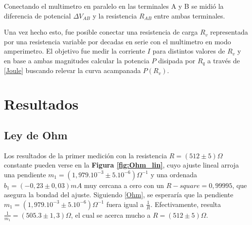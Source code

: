 \documentclass[11pt,a4paper]{article}
\begin{document}
Conectando el multimetro en paralelo en las terminales A y B se midió la diferencia de potencial $\Delta V_{AB}$ y la resistencia $R_{AB}$  entre ambas terminales.

Una vez hecho esto, fue posible conectar una resistencia de carga $R_v$ representada por una resistencia variable por decadas en serie con el multimetro en modo amperimetro. El objetivo fue medir la corriente $I$ para distintos valores de $R_v$ y en base a ambas magnitudes calcular la potencia $P$ disipada por $R_q$ a través de \eqref{Joule} buscando relevar la curva acampanada $P(R_v)$.




\section{Resultados}
\label{sec:discusion}

\subsection{Ley de Ohm}

Los resultados de la primer medición con la resistencia $R = (512 \pm 5)\Omega$ constante pueden verse en la \textbf{Figura \ref{fig:Ohm_lin}}, cuyo ajuste lineal arroja una pendiente $m_1 = (1,979.10^{-3} \pm 5.10^{-6})\Omega^{-1}$ y una ordenada $b_1 = (-0,23\pm 0,03)mA$ muy cercana a cero con un $R-square = 0,99995$, que asegura la bondad del ajuste. Siguiendo \eqref{Ohm}, se esperaría que la pendiente $m_1 = (1,979.10^{-3} \pm 5.10^{-6})\Omega^{-1}$ fuera igual a $\frac{1}{R}$. Efectivamente, resulta $\frac{1}{m_1} = (505.3 \pm 1,3)\Omega$, el cual se acerca mucho a $R = (512 \pm 5)\Omega$.
\end{document}
